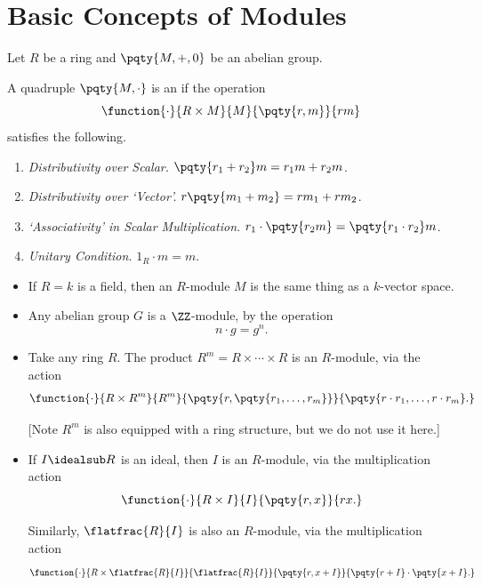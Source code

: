 \section{Basic Concepts of Modules}

Let \(R\) be a ring and \(\pqty{M, +, 0}\) be an abelian group.

\begin{definition}[\(R\)-Module]
    \label{def:r-module}%
    A quadruple \(\pqty{M, \cdot}\) is an  if the operation
    \[
        \function{\cdot}{R \times M}{M}{\pqty{r, m}}{rm}
    \]
    satisfies the following.

    \begin{enumerate}
        \item \textit{Distributivity over Scalar.} \(\pqty{r_1 + r_2} m = r_1 m + r_2 m\).
        \item \textit{Distributivity over `Vector'.} \(r \pqty{m_1 + m_2} = r m_1 + r m_2\).
        \item \textit{`Associativity' in Scalar Multiplication.} \(r_1 \cdot \pqty{r_2 m} = \pqty{r_1 \cdot r_2} m\).
        \item \textit{Unitary Condition.} \(1_{R} \cdot m = m\).
    \end{enumerate}
\end{definition}

\begin{examples}
    \label{ex:examples-r-modules}%
    \begin{itemize}
        \item If \(R = k\) is a field, then an \(R\)-module \(M\) is the same thing as a \(k\)-vector space.
        \item Any abelian group \(G\) is a \(\ZZ\)-module, by the operation
        \[
            n \cdot g = g^n.
        \]
        \item Take any ring \(R\). The product \(R^m = R \times \cdots \times R\) is an \(R\)-module, via the action
        \[
            \function{\cdot}{R \times R^m}{R^m}{\pqty{r, \pqty{r_1, \ldots, r_m}}}{\pqty{r \cdot r_1, \ldots, r \cdot r_m}.}
        \]

        [Note \(R^m\) is also equipped with a ring structure, but we do not use it here.]

        \item If \(I \idealsub R\) is an ideal, then \(I\) is an \(R\)-module, via the multiplication action
        \[
            \function{\cdot}{R \times I}{I}{\pqty{r, x}}{rx.}
        \]

        Similarly, \(\flatfrac{R}{I}\) is also an \(R\)-module, via the multiplication action
        \[
            \function{\cdot}{R \times \flatfrac{R}{I}}{\flatfrac{R}{I}}{\pqty{r, x + I}}{\pqty{r + I} \cdot \pqty{x + I}.}
        \]
    \end{itemize}
\end{examples}

